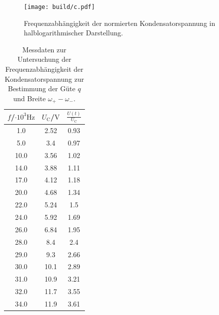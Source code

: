 \begin{figure}
	\centering
	\texttt{[image: build/c.pdf]}
	\caption{Frequenzabhängigkeit der normierten Kondensatorspannung in halblogarithmischer Darstellung.}
	\label{fig:q}
\end{figure}
\begin{table}
	\caption{Messdaten zur Untersuchung der Frequenzabhängigkeit der Kondensatorspannung zur Bestimmung der Güte $q$ und Breite $\omega_+ - \omega_- $.}
	\label{tab:Kuh}
	\centering
	\begin{tabular}{ccc}
		\toprule
		$f$/$\cdot 10^{3} \si{\Hz}$ & $U_\text{C}$/$\si{\volt}$ & $\frac{U(t)}{U_\text{C}}$ \\
		\midrule
		1.0                         & 2.52                      & 0.93                      \\
		5.0                         & 3.4                       & 0.97                      \\
		10.0                        & 3.56                      & 1.02                      \\
		14.0                        & 3.88                      & 1.11                      \\
		17.0                        & 4.12                      & 1.18                      \\
		20.0                        & 4.68                      & 1.34                      \\
		22.0                        & 5.24                      & 1.5                       \\
		24.0                        & 5.92                      & 1.69                      \\
		26.0                        & 6.84                      & 1.95                      \\
		28.0                        & 8.4                       & 2.4                       \\
		29.0                        & 9.3                       & 2.66                      \\
		30.0                        & 10.1                      & 2.89                      \\
		31.0                        & 10.9                      & 3.21                      \\
		32.0                        & 11.7                      & 3.55                      \\
		34.0                        & 11.9                      & 3.61                      \\

\end{tabular}
\end{table}
